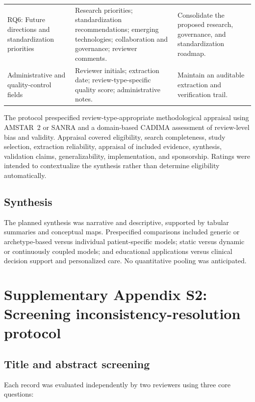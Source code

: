 \begin{table}[!htbp]
\begin{tabularx}{\textwidth}{@{}>{\raggedright\arraybackslash}p{}YY@{}}
RQ6: Future directions and standardization priorities &
Research priorities; standardization recommendations; emerging technologies; collaboration and governance; reviewer comments. &
Consolidate the proposed research, governance, and standardization roadmap. \\
\addlinespace[0.45em]

Administrative and quality-control fields &
Reviewer initials; extraction date; review-type-specific quality score; administrative notes. &
Maintain an auditable extraction and verification trail. \\
\bottomrule
\end{tabularx}
\end{table}

The protocol prespecified review-type-appropriate methodological appraisal using AMSTAR~2 or SANRA and a domain-based CADIMA assessment of review-level bias and validity. Appraisal covered eligibility, search completeness, study selection, extraction reliability, appraisal of included evidence, synthesis, validation claims, generalizability, implementation, and sponsorship. Ratings were intended to contextualize the synthesis rather than determine eligibility automatically.

\subsection{Synthesis}

The planned synthesis was narrative and descriptive, supported by tabular summaries and conceptual maps. Prespecified comparisons included generic or archetype-based versus individual patient-specific models; static versus dynamic or continuously coupled models; and educational applications versus clinical decision support and personalized care. No quantitative pooling was anticipated.

\clearpage
\section{Supplementary Appendix S2: Screening inconsistency-resolution protocol}
\label{app:adjudication}

\subsection{Title and abstract screening}

Each record was evaluated independently by two reviewers using three core questions:

